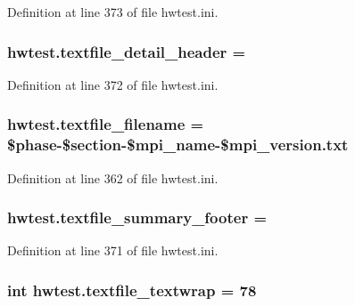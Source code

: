Definition at line 373 of file hwtest.\-ini.

\hypertarget{namespacehwtest_ae80f390eb87caf3467f8b53883932b9f}{
\subsubsection[{textfile\-\_\-detail\-\_\-header}]{\setlength{\rightskip}{0pt plus 5cm}hwtest.\-textfile\-\_\-detail\-\_\-header =}}\label{namespacehwtest_ae80f390eb87caf3467f8b53883932b9f}


Definition at line 372 of file hwtest.\-ini.

\hypertarget{namespacehwtest_ad10ebcdde85ff5608f5b974987766b82}{
\subsubsection[{textfile\-\_\-filename}]{\setlength{\rightskip}{0pt plus 5cm}hwtest.\-textfile\-\_\-filename = \$phase-\/\$section-\/\$mpi\-\_\-name-\/\$mpi\-\_\-version.\-txt}}\label{namespacehwtest_ad10ebcdde85ff5608f5b974987766b82}


Definition at line 362 of file hwtest.\-ini.

\hypertarget{namespacehwtest_a75ec114b65b92671173085f162edb84f}{
\subsubsection[{textfile\-\_\-summary\-\_\-footer}]{\setlength{\rightskip}{0pt plus 5cm}hwtest.\-textfile\-\_\-summary\-\_\-footer =}}\label{namespacehwtest_a75ec114b65b92671173085f162edb84f}


Definition at line 371 of file hwtest.\-ini.

\hypertarget{namespacehwtest_ae9e1387323c72cd6970ef27480e3ea21}{
\subsubsection[{textfile\-\_\-textwrap}]{\setlength{\rightskip}{0pt plus 5cm}int hwtest.\-textfile\-\_\-textwrap = 78}}\label{namespacehwtest_ae9e1387323c72cd6970ef27480e3ea21}


